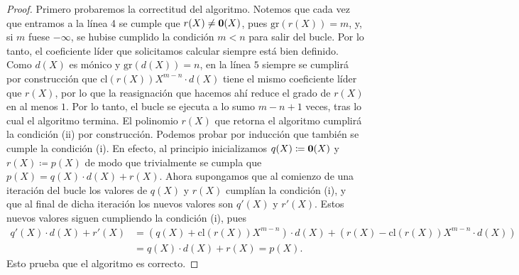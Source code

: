 \begin{proof}
Primero probaremos la correctitud del algoritmo. 
Notemos que cada vez que entramos a la línea 4 se cumple que $r(X) \neq \mathbf{0}(X)$, pues $\mathrm{gr}(r(X)) = m$, y, si $m$ fuese $-\infty$, se hubise cumplido la condición $m < n$ para salir del bucle. Por lo tanto, el coeficiente líder que solicitamos calcular siempre está bien definido.
Como $d(X)$ es mónico y $\mathrm{gr}(d(X)) = n$, en la línea $5$ siempre se cumplirá por construcción que $\mathrm{cl}(r(X)) X^{m-n} \cdot d(X)$ tiene el mismo coeficiente líder que $r(X)$, por lo que la reasignación que hacemos ahí reduce el grado de $r(X)$ en al menos $1$. Por lo tanto, el bucle se ejecuta a lo sumo $m-n+1$ veces, tras lo cual el algoritmo termina. El polinomio $r(X)$ que retorna el algoritmo cumplirá la condición (ii) por construcción. Podemos probar por inducción que también se cumple la condición (i). En efecto, al principio inicializamos $q(X) \coloneq \mathbf{0}(X)$ y $r(X) \coloneq p(X)$ de modo que trivialmente se cumpla que $p(X) = q(X) \cdot d(X) + r(X)$. Ahora supongamos que al comienzo de una iteración del bucle los valores de $q(X)$ y $r(X)$ cumplían la condición (i), y que al final de dicha iteración los nuevos valores son $q'(X)$ y $r'(X)$. Estos nuevos valores siguen cumpliendo la condición (i), pues
\begin{align*}
q'(X) \cdot d(X) + r'(X) &= (q(X)+\mathrm{cl}(r(X))X^{m-n}) \cdot d(X) + (r(X) - \mathrm{cl}(r(X)) X^{m-n} \cdot d(X)) \\
&= q(X) \cdot d(X) + r(X)
= p(X).
\end{align*}
Esto prueba que el algoritmo es correcto.


\end{proof}

